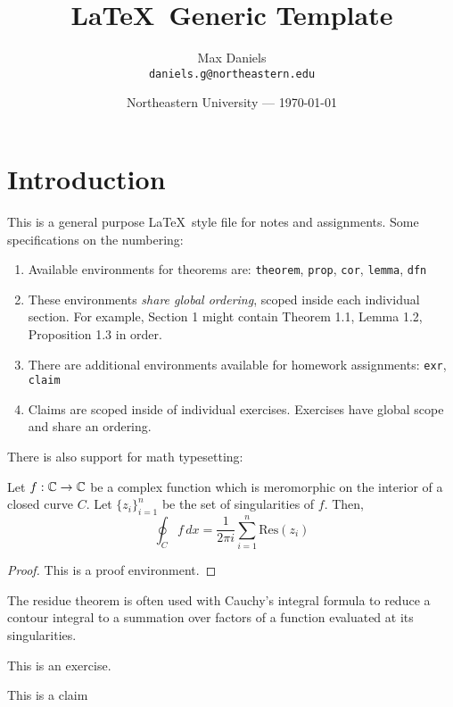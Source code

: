 \documentclass{article}
\title{\LaTeX~Generic Template}
\author{Max Daniels\\ \texttt{daniels.g@northeastern.edu}}
\date{Northeastern University --- \today}
\begin{document}
\maketitle 


\section*{Introduction}
This is a general purpose \LaTeX~style file for notes and assignments. Some specifications on the numbering:
\begin{enumerate}
    \item Available environments for theorems are: \texttt{theorem}, \texttt{prop}, \texttt{cor}, \texttt{lemma}, \texttt{dfn}
    \item These environments \textit{share global ordering}, scoped inside each individual section. For example, Section 1 might contain Theorem 1.1, Lemma 1.2, Proposition 1.3 in order. 
    \item There are additional environments available for homework assignments: \texttt{exr}, \texttt{claim}
    \item Claims are scoped inside of individual exercises. Exercises have global scope and share an ordering.
\end{enumerate}
There is also support for math typesetting:
\begin{theorem}
Let $f: {\mathbb C} \to {\mathbb C}$ be a complex function which is meromorphic on the interior of a closed curve $C$. Let $\{z_i\}_{i=1}^n$ be the set of singularities of $f$. Then,
\begin{equation*}
    \oint_{C} f \, dx = \frac{1}{2\pi i} \sum_{i=1}^n \text{Res}(z_i)
\end{equation*}
\end{theorem}
\begin{proof}
This is a proof environment.
\end{proof}
\begin{rem}
The residue theorem is often used with Cauchy's integral formula to reduce a contour integral to a summation over factors of a function evaluated at its singularities. 
\end{rem}

\begin{exr}[Given]
This is an exercise.
    \begin{claim}
    This is a claim
    \end{claim}
\end{exr}
\end{document}
